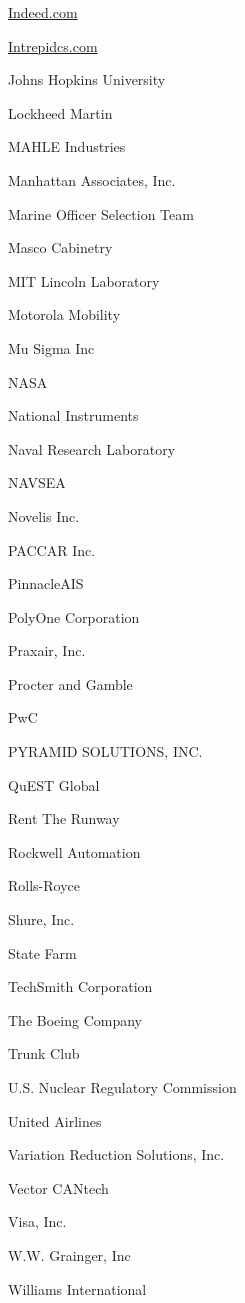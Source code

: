 \documentclass[twoside]{article}
\begin{document}
\begin{center}
\begin{multicols}{5}
\begin{FlushLeft}
\begin{compactitem}
\item \url{Indeed.com}
\item \url{Intrepidcs.com}
\item Johns Hopkins University
\item Lockheed Martin
\item MAHLE Industries
\item Manhattan Associates, Inc.
\item Marine Officer Selection Team
\item Masco Cabinetry
\item MIT Lincoln Laboratory
\item Motorola Mobility
\item Mu Sigma Inc
\item NASA
\item National Instruments
\item Naval Research Laboratory
\item NAVSEA
\item Novelis Inc.
\item PACCAR Inc.
\item PinnacleAIS
\item PolyOne Corporation
\item Praxair, Inc.
\item Procter and Gamble
\item PwC
\item PYRAMID SOLUTIONS, INC.
\item QuEST Global
\item Rent The Runway
\item Rockwell Automation
\item Rolls-Royce
\item Shure, Inc.
\item State Farm
\item TechSmith Corporation
\item The Boeing Company
\item Trunk Club
\item U.S. Nuclear Regulatory Commission
\item United Airlines
\item Variation Reduction Solutions, Inc.
\item Vector CANtech
\item Visa, Inc.
\item W.W. Grainger, Inc
\item Williams International
\end{compactitem}
        \end{FlushLeft}

\end{multicols}
\end{center}
\end{document}
